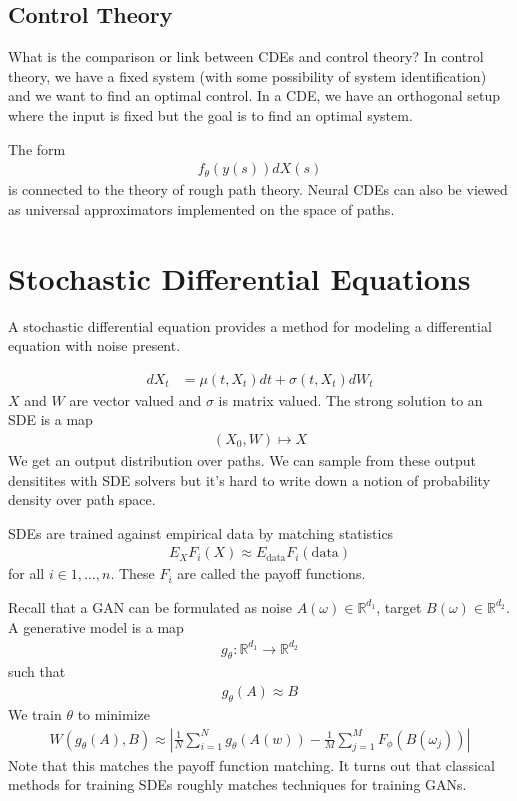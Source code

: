 \documentclass[book.tex]{subfiles}
\begin{document}
\subsection{Control Theory}
What is the comparison or link between CDEs and control theory? In control theory, we have a fixed system (with some possibility of system identification) and we want to find an optimal control. In a CDE, we have an orthogonal setup where the input is fixed but the goal is to find an optimal system. 

The form 
\begin{align}
f_\theta(y(s)) dX(s)
\end{align}
is connected to the theory of rough path theory. Neural CDEs can also be viewed as universal approximators implemented on the space of paths.

\section{Stochastic Differential Equations}

A stochastic differential equation provides a method for modeling a differential equation with noise present.

\begin{align}
    dX_t &= \mu(t, X_t) dt + \sigma(t, X_t) dW_t
\end{align}
 $X$ and $W$ are vector valued and $\sigma$ is matrix valued. The strong solution to an SDE is a map
 \begin{align}
 (X_0, W) \mapsto X
 \end{align}
We get an output distribution over paths. We can sample from these output densitites with SDE solvers but it's hard to write down a notion of probability density over path space.
 
SDEs are trained against empirical data by matching statistics
\begin{align}
    E_X F_i(X) \approx E_{\textrm{data}} F_i(\textrm{data})
\end{align}
for all $i \in 1,\dotsc, n$. These $F_i$ are called the payoff functions.
 
Recall that a GAN can be formulated as noise $A(\omega) \in \mathbb{R}^{d_1}$, target $B(\omega) \in \mathbb{R}^{d_2}$. A generative model is a map
\begin{align}
     g_\theta: \mathbb{R}^{d_1} \to \mathbb{R}^{d_2} 
\end{align}
such that 
\begin{align}
    g_\theta(A) \approx B
\end{align}
We train $\theta$ to minimize
\begin{align}
    W(g_\theta(A), B) \approx \left | \frac{1}{N} \sum_{i=1}^N g_\theta(A(w)) - \frac{1}{M} \sum_{j=1}^M F_\phi(B(\omega_j)) \right|
\end{align}
Note that this matches the payoff function matching. It turns out that classical methods for training SDEs roughly matches techniques for training GANs.
\end{document}
